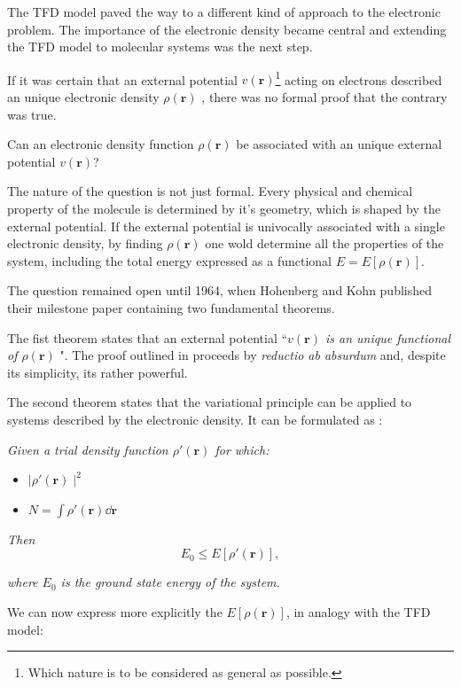\documentclass[a4paper,12pt]{article}
\newcommand\dens{\rho(\mathbf{r})}
\begin{document}
The TFD model paved the way to a different kind of approach to the electronic problem. 
The importance of the electronic density became central and extending the TFD model to molecular systems was the next step.

If it was certain that an external potential $v(\mathbf{r})$\footnote{Which nature is to be considered as general as possible.} acting on electrons described an unique electronic density $\dens$ \cite[p.318]{Atkins}, there was no formal proof that the contrary was true.

Can an electronic density function $\rho(\mathbf{r})$ be associated with an unique external potential $v(\mathbf{r})$?

The nature of the question is not just formal. 
Every physical and chemical property of the molecule is determined by it's geometry, which is shaped by the external potential.
If the external potential is univocally associated with a single electronic density, by finding $\rho(\mathbf{r})$ one wold determine all the properties of the system, including the total energy expressed as a functional $E =E[\rho(\mathbf{r})]$.

The question remained open until 1964, when Hohenberg and Kohn published their milestone paper \cite{HK} containing two fundamental theorems.

The fist theorem states that an external potential ``\textit{$v(\mathbf{r})$ is an unique functional of $\rho(\mathbf{r})$ }".
The proof outlined in \cite{HK} proceeds by \textit{reductio ab absurdum} and, despite its simplicity, its rather powerful.

The second theorem states that the variational principle can be applied to systems described by the electronic density.
It can be formulated as : 

\textit{Given a trial density function $\rho'(\mathbf{r})$ for which: }

\begin{itemize}
	\item $\mid \rho'(\mathbf{r}) \mid^2$ 
	\item $N = \int \rho'(\mathbf{r}) \dd{\mathbf{r}}$
\end{itemize}

\textit{Then}
\begin{equation}
	E_0 \leq E[\rho'(\mathbf{r})],
\end{equation}

\textit{where $E_0$ is the ground state energy of the system.}

We can now express more explicitly the $E[\dens]$, in analogy with the TFD model:
\end{document}

